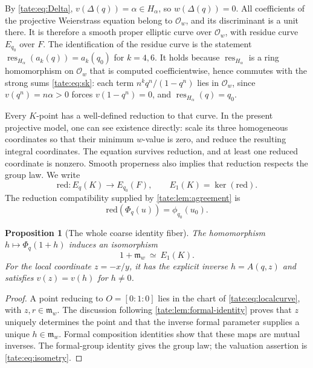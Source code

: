 \documentclass[11pt,letterpaper]{article}
\newtheorem{proposition}[proposition]{Proposition}
\theoremstyle{definition}
\newcommand{\res}{\operatorname{res}}
\newcommand{\m}{\mathfrak m}
\newcommand{\OO}{\mathcal O}
\begin{document}
By \eqref{tate:eq:Delta}, $v(\Delta(q))=\alpha\in H_\alpha$, so
$w(\Delta(q))=0$. All coefficients of the projective Weierstrass equation
belong to $\OO_w$, and its discriminant is a unit there. It is therefore
a smooth proper elliptic curve over $\OO_w$, with residue curve
$E_{q_0}$ over $F$. The identification of the residue curve is the
statement $\res_{H_\alpha}(a_k(q))=a_k(q_0)$ for $k=4,6$. It holds
because $\res_{H_\alpha}$ is a ring homomorphism on $\OO_w$ that is
computed coefficientwise, hence commutes with the strong sums
\eqref{tate:eq:sk}: each term $n^kq^n/(1-q^n)$ lies in $\OO_w$, since
$v(q^n)=n\alpha>0$ forces $v(1-q^n)=0$, and
$\res_{H_\alpha}(q)=q_0$.

Every $K$-point has a well-defined reduction to that curve. In the
present projective model, one can see existence directly: scale its
three homogeneous coordinates so that their minimum $w$-value is
zero, and reduce the resulting integral coordinates. The equation
survives reduction, and at least one reduced coordinate is nonzero.
Smooth properness also implies that reduction respects the group law.
We write
\[
 \mathrm{red}:E_q(K)\longrightarrow E_{q_0}(F),
 \qquad E_1(K)=\ker(\mathrm{red}).
\]
The reduction compatibility supplied by \cref{tate:lem:agreement} is
\begin{equation}
 \mathrm{red}(\Phi_q(u))=\phi_{q_0}(u_0).\label{tate:eq:redcompat}
\end{equation}

\begin{proposition}[The whole coarse identity fiber]\label{tate:prop:identityfiber}
The homomorphism $h\mapsto\Phi_q(1+h)$ induces an isomorphism
\begin{equation}
 1+\m_w\ \simeq\ E_1(K).\label{tate:eq:identityfiber}
\end{equation}
For the local coordinate $z=-x/y$, it has the explicit inverse
$h=A(q,z)$ and satisfies $v(z)=v(h)$ for $h\ne0$.
\end{proposition}

\begin{proof}
A point reducing to $O=[0:1:0]$ lies in the chart of
\eqref{tate:eq:localcurve}, with $z,r\in\m_w$. The discussion following
\cref{tate:lem:formal-identity} proves that $z$ uniquely determines the
point and that the inverse formal parameter supplies a unique
$h\in\m_w$. Formal composition identities show that these maps are
mutual inverses. The formal-group identity gives the group law; the
valuation assertion is \eqref{tate:eq:isometry}.
\end{proof}
\end{document}

